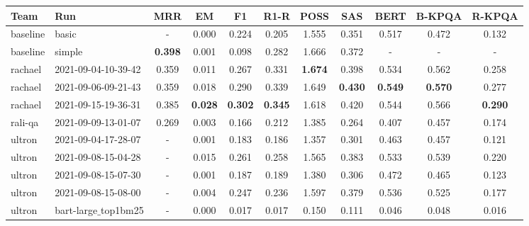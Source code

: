 \begin{tabular}{@{}llCCCCCCCCC@{}}
\toprule
\bf Team & \bf Run                               & \bf MRR   & \bf EM    & \bf F1    & \bf R1-R  & \bf POSS  & \bf SAS   & \bf BERT  & \bf B-KPQA & \bf R-KPQA \\
\midrule                                                                                                                                              
baseline & basic                                 & -         & 0.000     & 0.224     & 0.205     & 1.555     & 0.351     & 0.517     & 0.472      & 0.132      \\
baseline & simple                                & \bf 0.398 & 0.001     & 0.098     & 0.282     & 1.666     & 0.372     & -         & -          & -          \\
\addlinespace[2pt]
rachael  & 2021-09-04-10-39-42                   & 0.359     & 0.011     & 0.267     & 0.331     & \bf 1.674 & 0.398     & 0.534     & 0.562      & 0.258      \\
rachael  & 2021-09-06-09-21-43                   & 0.359     & 0.018     & 0.290     & 0.339     & 1.649     & \bf 0.430 & \bf 0.549 & \bf 0.570  & 0.277      \\
rachael  & 2021-09-15-19-36-31                   & 0.385     & \bf 0.028 & \bf 0.302 & \bf 0.345 & 1.618     & 0.420     & 0.544     & 0.566      & \bf 0.290  \\
\addlinespace[2pt]
rali-qa  & 2021-09-09-13-01-07                   & 0.269     & 0.003     & 0.166     & 0.212     & 1.385     & 0.264     & 0.407     & 0.457      & 0.174      \\
\addlinespace[2pt]
ultron   & 2021-09-04-17-28-07                   & -         & 0.001     & 0.183     & 0.186     & 1.357     & 0.301     & 0.463     & 0.457      & 0.121      \\
ultron   & 2021-09-08-15-04-28                   & -         & 0.015     & 0.261     & 0.258     & 1.565     & 0.383     & 0.533     & 0.539      & 0.220      \\
ultron   & 2021-09-08-15-07-30                   & -         & 0.001     & 0.187     & 0.189     & 1.380     & 0.306     & 0.472     & 0.465      & 0.123      \\
ultron   & 2021-09-08-15-08-00                   & -         & 0.004     & 0.247     & 0.236     & 1.597     & 0.379     & 0.536     & 0.525      & 0.177      \\
ultron   & bart-large$\_$top1bm25                & -         & 0.000     & 0.017     & 0.017     & 0.150     & 0.111     & 0.046     & 0.048      & 0.016      \\

\end{tabular}
